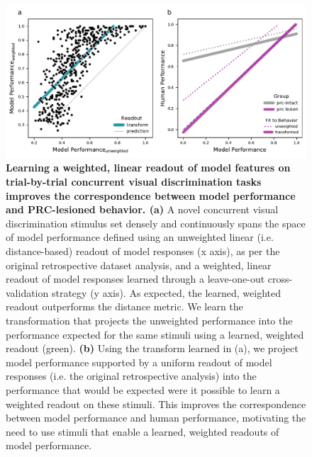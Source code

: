 \documentclass[11pt]{article}
\begin{document}
\begin{figure}[ht]
\centering
\includegraphics[width=\linewidth]{figures/S3}
\caption{\textbf{ Learning a weighted, linear readout of model features on trial-by-trial concurrent visual discrimination tasks improves the correspondence between model performance and PRC-lesioned behavior. (a)} A novel concurrent visual discrimination stimulus set densely and continuously spans the space of model performance defined using an unweighted linear (i.e. distance-based) readout of model responses (x axis), as per the original retrospective dataset analysis, and a weighted, linear readout of model responses learned through a leave-one-out cross-validation strategy (y axis). As expected, the learned, weighted readout outperforms the distance metric. We learn the transformation that projects the unweighted performance into the performance expected for the same stimuli using a learned, weighted readout (green). \textbf{(b)} Using the transform learned in (a), we project model performance supported by a uniform readout of model responses (i.e. the original retrospective analysis) into the performance that would be expected were it possible to learn a weighted readout on these stimuli. This improves the correspondence between model performance and human performance, motivating the need to use stimuli that enable a learned, weighted readouts of model performance.}
\label{fig:compare_readouts}
\end{figure}
\end{document}
